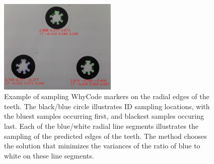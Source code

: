\begin{figure}
    \centering
    \includegraphics[width=0.5\textwidth]{images/cropped_whycode_3_8_ellipse_sampling_example}
    \caption{Example of sampling WhyCode markers on the radial edges of the teeth.
    The black/blue circle illustrates ID sampling locations, with the bluest samples occurring first, and blackest samples occuring last.
    Each of the blue/white radial line segments illustrates the sampling of the predicted edges of the teeth.
    The method chooses the solution that minimizes the variances of the ratio of blue to white on these line segments.
    }
    \label{figure:ellipse_sampling}
\end{figure}

